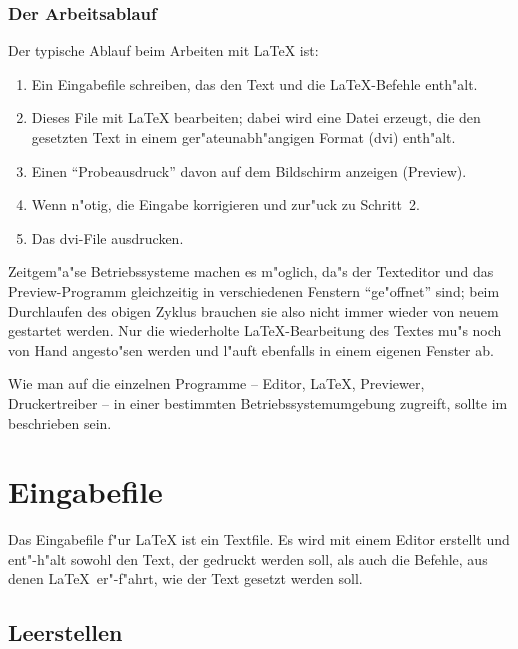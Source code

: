 \subsubsection{Der Arbeitsablauf}
Der typische Ablauf beim Arbeiten mit \LaTeX{} ist:
\begin{enumerate}
  \item Ein Eingabefile schreiben, das den Text und die \LaTeX-Befehle 
  enth"alt.
  \item Dieses File mit \LaTeX{} bearbeiten; dabei wird eine Datei
  erzeugt, die den gesetzten Text in einem ger"ateunabh"angigen Format
  (dvi) enth"alt.
  \item Einen "`Probeausdruck"' davon auf dem Bildschirm anzeigen (Preview).
  \item Wenn n"otig, die Eingabe korrigieren und zur"uck zu Schritt~2.
  \item Das dvi-File ausdrucken.
\end{enumerate}
Zeitgem"a"se Betriebssysteme machen es m"oglich, da"s der Texteditor
und das Preview-Programm gleichzeitig in verschiedenen Fenstern 
"`ge"offnet"' sind; beim Durchlaufen des obigen Zyklus brauchen sie 
also nicht immer wieder von neuem gestartet werden.  Nur die 
wiederholte \LaTeX-Bearbeitung des Textes mu"s noch von Hand 
angesto"sen werden und l"auft ebenfalls in einem eigenen Fenster ab.

Wie man auf die einzelnen Programme -- Editor, \LaTeX, Previewer,
Druckertreiber -- in einer bestimmten
Betriebs\-system\-umgebung zugreift, sollte im \local{}
beschrieben sein.



\section{Eingabefile}
Das Eingabefile f"ur \LaTeX{} ist ein Textfile. Es wird mit einem
Editor erstellt und ent"-h"alt sowohl den Text, der gedruckt
werden soll, als auch die Befehle, aus denen \LaTeX\ er"-f"ahrt,
wie der Text gesetzt werden soll.


\subsection{Leerstellen}
 
